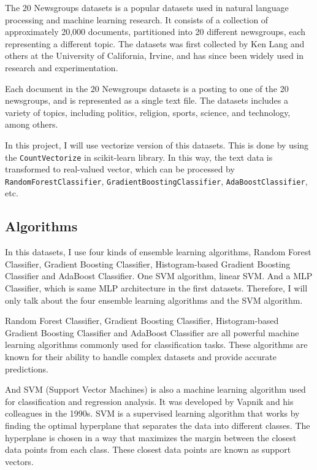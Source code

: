 \documentclass[twocolumn, draft]{extarticle}
\begin{document}
The 20 Newsgroups datasets is a popular datasets used in natural language processing and machine learning research. It consists of a collection of approximately 20,000 documents, partitioned into 20 different newsgroups, each representing a different topic. The datasets was first collected by Ken Lang and others at the University of California, Irvine, and has since been widely used in research and experimentation.

Each document in the 20 Newsgroups datasets is a posting to one of the 20 newsgroups, and is represented as a single text file. The datasets includes a variety of topics, including politics, religion, sports, science, and technology, among others.

In this project, I will use vectorize version of this datasets. This is done by using the \texttt{CountVectorize} in scikit-learn library. In this way, the text data is transformed to real-valued vector, which can be processed by \texttt{RandomForestClassifier}, \texttt{GradientBoostingClassifier}, \texttt{AdaBoostClassifier}, etc.

\subsection{Algorithms}

In this datasets, I use four kinds of ensemble learning algorithms, Random Forest Classifier, Gradient Boosting Classifier, Histogram-based Gradient Boosting Classifier and AdaBoost Classifier. One SVM algorithm, linear SVM. And a MLP Classifier, which is same MLP architecture in the first datasets. Therefore, I will only talk about the four ensemble learning algorithms and the SVM algorithm.

Random Forest Classifier, Gradient Boosting Classifier, Histogram-based Gradient Boosting Classifier and AdaBoost Classifier are all powerful machine learning algorithms commonly used for classification tasks. These algorithms are known for their ability to handle complex datasets and provide accurate predictions.

And SVM (Support Vector Machines) is also a machine learning algorithm used for classification and regression analysis. It was developed by Vapnik and his colleagues in the 1990s. SVM is a supervised learning algorithm that works by finding the optimal hyperplane that separates the data into different classes. The hyperplane is chosen in a way that maximizes the margin between the closest data points from each class. These closest data points are known as support vectors.
\end{document}
